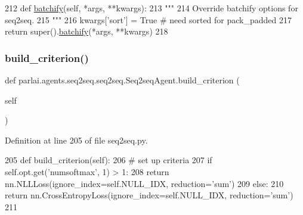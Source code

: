 \begin{DoxyCode}
212     \textcolor{keyword}{def }\hyperlink{namespaceparlai_1_1agents_1_1drqa_1_1utils_aca22dd97c5b6dcda2a7479c1cb22ef1e}{batchify}(self, *args, **kwargs):
213         \textcolor{stringliteral}{"""}
214 \textcolor{stringliteral}{        Override batchify options for seq2seq.}
215 \textcolor{stringliteral}{        """}
216         kwargs[\textcolor{stringliteral}{'sort'}] = \textcolor{keyword}{True}  \textcolor{comment}{# need sorted for pack\_padded}
217         \textcolor{keywordflow}{return} super().\hyperlink{namespaceparlai_1_1agents_1_1drqa_1_1utils_aca22dd97c5b6dcda2a7479c1cb22ef1e}{batchify}(*args, **kwargs)
218 
\end{DoxyCode}
\mbox{\label{classparlai_1_1agents_1_1seq2seq_1_1seq2seq_1_1Seq2seqAgent_aad570608fb05da482411201aa2e0b47f}} 
\subsubsection{\texorpdfstring{build\+\_\+criterion()}{build\_criterion()}}
{\footnotesize\ttfamily def parlai.\+agents.\+seq2seq.\+seq2seq.\+Seq2seq\+Agent.\+build\+\_\+criterion (\begin{DoxyParamCaption}\item[{}]{self }\end{DoxyParamCaption})}



Definition at line 205 of file seq2seq.\+py.


\begin{DoxyCode}
205     \textcolor{keyword}{def }build\_criterion(self):
206         \textcolor{comment}{# set up criteria}
207         \textcolor{keywordflow}{if} self.opt.get(\textcolor{stringliteral}{'numsoftmax'}, 1) > 1:
208             \textcolor{keywordflow}{return} nn.NLLLoss(ignore\_index=self.NULL\_IDX, reduction=\textcolor{stringliteral}{'sum'})
209         \textcolor{keywordflow}{else}:
210             \textcolor{keywordflow}{return} nn.CrossEntropyLoss(ignore\_index=self.NULL\_IDX, reduction=\textcolor{stringliteral}{'sum'})
211 
\end{DoxyCode}
\mbox{\label{classparlai_1_1agents_1_1seq2seq_1_1seq2seq_1_1Seq2seqAgent_a43422bdf284bfc06a9bd2db434a7167c}} 
